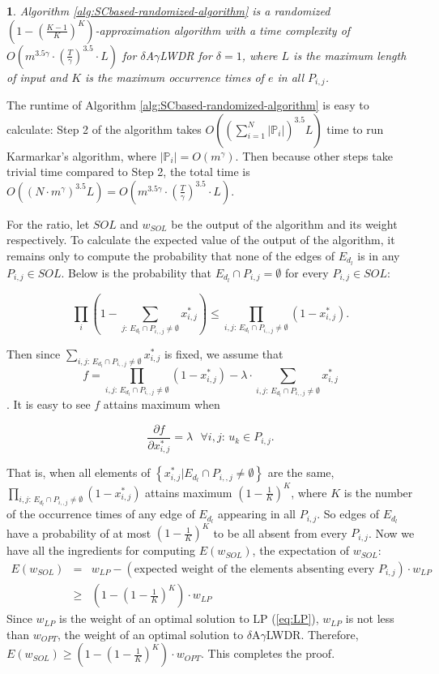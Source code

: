 \documentclass[11pt,english,onecolumn,draftcls]{IEEEtran}
\theoremstyle{plain}
\theoremstyle{plain}
\theoremstyle{plain}
\newtheorem{lem}[thm]{\protect\lemmaname}
\theoremstyle{plain}
\providecommand{\lemmaname}{Lemma}
\begin{document}
\begin{lem}
\label{lem:SCratioproof}Algorithm \ref{alg:SCbased-randomized-algorithm}
is a randomized $(1-(\frac{K-1}{K})^{K})$-approximation algorithm
with a time complexity of $O(m^{3.5\gamma}\cdot(\frac{T}{\gamma})^{3.5}\cdot L)$
for $\delta$A$\gamma$LWDR for $\delta=1$, where $L$ is the maximum
length of input and $K$ is the maximum occurrence times of $e$ in
all $P_{i,j}$. \end{lem}
\begin{IEEEproof}
The runtime of Algorithm \ref{alg:SCbased-randomized-algorithm}
is easy to calculate: Step 2 of the algorithm takes $O\left(\left(\sum_{i=1}^{N}\vert\mathbb{P}{}_{i}\vert\right)^{3.5}L\right)$
time to run Karmarkar's algorithm, where $\vert\mathbb{P}_{i}\vert=O\left(m^{\gamma}\right)$.
Then because other steps take trivial time compared to Step 2, the
total time is $O(\left(N\cdot m^{\gamma}\right)^{3.5}L)=O(m^{3.5\gamma}\cdot(\frac{T}{\gamma})^{3.5}\cdot L)$.

For the ratio, let $SOL$ and $w_{SOL}$ be the output of the algorithm
and its weight respectively. To calculate the expected value of the
output of the algorithm, it remains only to compute the probability
that none of the edges of $E_{d_{l}}$ is in any $P_{i,j}\in SOL$.
Below is the probability that $E_{d_{l}}\cap P_{i,j}=\emptyset$ for
every $P_{i,j}\in SOL$:

\[
\prod_{i}\left(1-\sum_{j:\, E_{d_{l}}\cap P_{i,,j}\neq\emptyset}x_{i,j}^{*}\right)\leq\prod_{i,j:\, E_{d_{l}}\cap P_{i,,j}\neq\emptyset}\left(1-x_{i,j}^{*}\right).
\]


Then since $\sum_{i,j:\, E_{d_{l}}\cap P_{i,,j}\neq\emptyset}x_{i,j}^{*}$
is fixed, we assume that \[f=\prod_{i,j:\, E_{d_{l}}\cap P_{i,,j}\neq\emptyset}(1-x_{i,j}^{*})-\lambda\cdot\sum_{i,j:\, E_{d_{l}}\cap P_{i,,j}\neq\emptyset}x_{i,j}^{*}\].
It is easy to see $f$ attains maximum when

\[
\frac{\partial f}{\partial x_{i,j}^{*}}=\lambda\mbox{ }\forall i,j:\, u_{k}\in P_{i,j}.
\]


That is, when all elements of $\left\{ x_{i,j}^{*}\vert E_{d_{l}}\cap P_{i,,j}\neq\emptyset\right\} $
are the same, $\prod_{i,j:\, E_{d_{l}}\cap P_{i,,j}\neq\emptyset}(1-x_{i,j}^{*})$
attains maximum $(1-\frac{1}{K})^{K}$, where $K$ is the number of
the occurrence times of any edge of $E_{d_{l}}$ appearing in all
$P_{i,j}$. So edges of $E_{d_{l}}$ have a probability of at most
$(1-\frac{1}{K})^{K}$ to be all absent from every $P_{i,j}$. Now
we have all the ingredients for computing $E(w_{SOL})$, the expectation
of $w_{SOL}$:
\begin{eqnarray}
E(w_{SOL}) & = & w_{LP}-(\mbox{expected weight of the elements absenting every }P_{i,j})\cdot w_{LP}\label{eq:optlp}\\
 & \geq & (1-(1-\frac{1}{K})^{K})\cdot w_{LP}\nonumber
\end{eqnarray}
Since $w_{LP}$ is the weight of an optimal solution to LP (\ref{eq:LP}),
$w_{LP}$ is not less than $w_{OPT}$, the weight of an optimal solution
to $\delta$A$\gamma$LWDR. Therefore, $E(w_{SOL})\geq(1-(1-\frac{1}{K})^{K})\cdot w_{OPT}$.
This completes the proof.
\end{IEEEproof}
\end{document}
